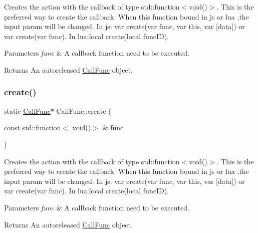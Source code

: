 Creates the action with the callback of type std\+::function$<$void()$>$. This is the preferred way to create the callback. When this function bound in js or lua ,the input param will be changed. In js\+: var create(var func, var this, var \mbox{[}data\mbox{]}) or var create(var func). In lua\+:local create(local func\+I\+D).


\begin{DoxyParams}{Parameters}
{\em func} & A callback function need to be executed. \\
\hline
\end{DoxyParams}
\begin{DoxyReturn}{Returns}
An autoreleased \hyperlink{classCallFunc}{Call\+Func} object. 
\end{DoxyReturn}
\mbox{\label{classCallFunc_ad572341c92990e1ff453fbc813990c59}} 
\subsubsection{\texorpdfstring{create()}{create()}\hspace{0.1cm}{\footnotesize\ttfamily [2/4]}}
{\footnotesize\ttfamily static \hyperlink{classCallFunc}{Call\+Func}$\ast$ Call\+Func\+::create (\begin{DoxyParamCaption}\item[{const std\+::function$<$ void()$>$ \&}]{func }\end{DoxyParamCaption})\hspace{0.3cm}{\ttfamily [static]}}

Creates the action with the callback of type std\+::function$<$void()$>$. This is the preferred way to create the callback. When this function bound in js or lua ,the input param will be changed. In js\+: var create(var func, var this, var \mbox{[}data\mbox{]}) or var create(var func). In lua\+:local create(local func\+I\+D).


\begin{DoxyParams}{Parameters}
{\em func} & A callback function need to be executed. \\
\hline
\end{DoxyParams}
\begin{DoxyReturn}{Returns}
An autoreleased \hyperlink{classCallFunc}{Call\+Func} object. 
\end{DoxyReturn}
\mbox{\label{classCallFunc_a4c5cbd1f08044f6e988abe5bb5c1a389}} 
